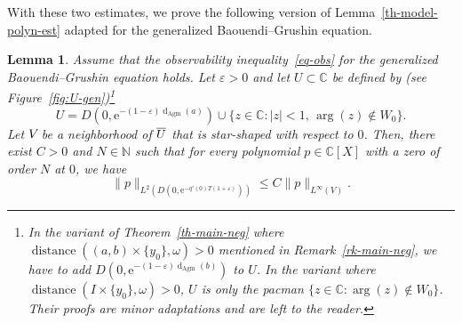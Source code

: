 \documentclass[10pt]{amsart}
\newtheorem{lemm}[theo]{Lemma}\newtheorem{prop}[theo]{Proposition}\newtheorem{coro}[theo]{Corollary}\newtheorem{conj}[theo]{Conjecture}
\theoremstyle{definition}\newtheorem{defi}[theo]{Definition}\newtheorem{rema}[theo]{Remark}\newtheorem{exam}[theo]{Example}\newtheorem{exem}[theo]{Example}\newtheorem{nota}[theo]{Notation}
\renewcommand{\leq}{\leqslant}
\newcommand{\1}{\mathds 1}
\DeclareMathOperator{\distance}{distance}
\newcommand{\dagmon}{\mathop{\mathrm{d}}\nolimits_{\mathrm{Agm}}}
\newcommand{\C}{\mathbb{C}}
\newcommand{\N}{\mathbb{N}}
\newcommand{\eu}{\mathrm e}
\newcommand{\e}{\varepsilon}
\renewcommand{\o}{\omega}
\newcommand*{\noic}{\sb{}\kern-\scriptspace }
\begin{document}
With these two estimates, we prove the following version of Lemma~\ref{th-model-polyn-est} adapted for the generalized Baouendi--Grushin equation.


\begin{lemm}\label{th-polyn-est}
Assume that the observability inequality~\eqref{eq-obs} for the generalized Baouendi--Grushin equation holds. Let $\e>0$ and let $U\subset \C$ be defined by (see Figure~\ref{fig:U-gen})\footnote{
In the variant of Theorem~\ref{th-main-neg} where $\distance((a,b)\times\{y_0\},\o)>0$ mentioned in Remark~\ref{rk-main-neg}, we have to add $D(0,\eu^{-(1-\e)\dagmon(b)})$ to $U$. In the variant where $\distance(I\times\{y_0\},\o)>0$, $U$ is only the pacman $\{ z\in \C\colon \arg(z)\notin W_0 \}$. Their proofs are minor adaptations and are left to the reader.\label{foot-variant1}
}
\[
U = D \left(0, \eu^{-(1-\e)\dagmon(a)}\right) \cup
\{ z\in \C\colon |z|<1, \, \arg(z)\notin W_0 \}.
\]
Let $V\noic$ be a neighborhood of $\overline{U}\noic$ that is star-shaped with respect to $0$. Then, there exist $C>0$ and $N\in \N$ such that for every polynomial $p\in \C[X]$ with a zero of order $N$ at $0$, we have
\[
\|p\|_{L^2\left(D\left(0,\eu^{-q'(0) T(1+\e)}\right)\right)} \leq C \|p\|_{L^\infty(V)}.
\]
\end{lemm}
\end{document}
